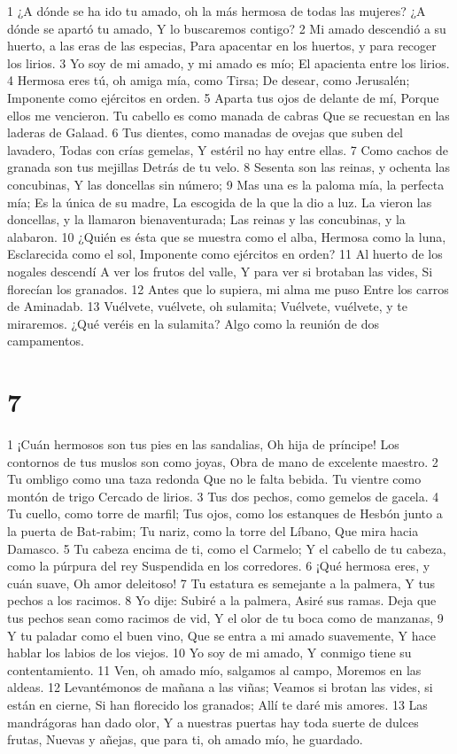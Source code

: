 1 ¿A dónde se ha ido tu amado, oh la más hermosa de todas las mujeres?
¿A dónde se apartó tu amado,
Y lo buscaremos contigo?
2 Mi amado descendió a su huerto, a las eras de las especias,
Para apacentar en los huertos, y para recoger los lirios.
3 Yo soy de mi amado, y mi amado es mío;
El apacienta entre los lirios.
4 Hermosa eres tú, oh amiga mía, como Tirsa;
De desear, como Jerusalén;
Imponente como ejércitos en orden.
5 Aparta tus ojos de delante de mí,
Porque ellos me vencieron.
Tu cabello es como manada de cabras
Que se recuestan en las laderas de Galaad.
6 Tus dientes, como manadas de ovejas que suben del lavadero,
Todas con crías gemelas,
Y estéril no hay entre ellas.
7 Como cachos de granada son tus mejillas
Detrás de tu velo.
8 Sesenta son las reinas, y ochenta las concubinas,
Y las doncellas sin número;
9 Mas una es la paloma mía, la perfecta mía;
Es la única de su madre,
La escogida de la que la dio a luz.
La vieron las doncellas, y la llamaron bienaventurada;
Las reinas y las concubinas, y la alabaron.
10 ¿Quién es ésta que se muestra como el alba,
Hermosa como la luna,
Esclarecida como el sol,
Imponente como ejércitos en orden?
11 Al huerto de los nogales descendí
A ver los frutos del valle,
Y para ver si brotaban las vides,
Si florecían los granados.
12 Antes que lo supiera, mi alma me puso
Entre los carros de Aminadab.
13 Vuélvete, vuélvete, oh sulamita;
Vuélvete, vuélvete, y te miraremos.
¿Qué veréis en la sulamita?
Algo como la reunión de dos campamentos.

\chapter{7}

1 ¡Cuán hermosos son tus pies en las sandalias,
Oh hija de príncipe!
Los contornos de tus muslos son como joyas,
Obra de mano de excelente maestro.
2 Tu ombligo como una taza redonda
Que no le falta bebida.
Tu vientre como montón de trigo
Cercado de lirios.
3 Tus dos pechos, como gemelos de gacela.
4 Tu cuello, como torre de marfil;
Tus ojos, como los estanques de Hesbón junto a la puerta de Bat-rabim;
Tu nariz, como la torre del Líbano,
Que mira hacia Damasco.
5 Tu cabeza encima de ti, como el Carmelo;
Y el cabello de tu cabeza, como la púrpura del rey
Suspendida en los corredores. 
6 ¡Qué hermosa eres, y cuán suave,
Oh amor deleitoso!
7 Tu estatura es semejante a la palmera,
Y tus pechos a los racimos.
8 Yo dije: Subiré a la palmera,
Asiré sus ramas.
Deja que tus pechos sean como racimos de vid,
Y el olor de tu boca como de manzanas,
9 Y tu paladar como el buen vino,
Que se entra a mi amado suavemente,
Y hace hablar los labios de los viejos.
10 Yo soy de mi amado,
Y conmigo tiene su contentamiento.
11 Ven, oh amado mío, salgamos al campo,
Moremos en las aldeas.
12 Levantémonos de mañana a las viñas;
Veamos si brotan las vides, si están en cierne,
Si han florecido los granados;
Allí te daré mis amores.
13 Las mandrágoras han dado olor,
Y a nuestras puertas hay toda suerte de dulces frutas,
Nuevas y añejas, que para ti, oh amado mío, he guardado. 

